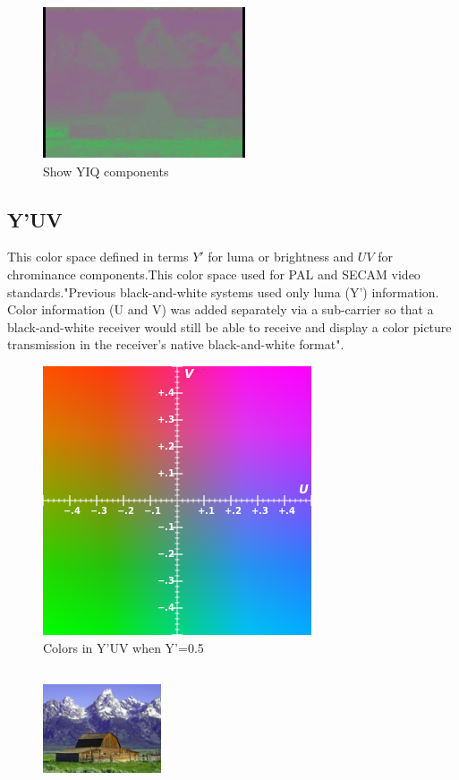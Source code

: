 \documentclass{article}
\begin{document}
\begin{multicols*}{2}
\begin{figure}[H]
\includegraphics[scale=0.5]{Q.png}
\caption{Show YIQ components}
\end{figure}
\subsection*{Y'UV}
This color space defined in terms \(Y'\) for luma or brightness and \(UV\) for chrominance components.This color space used for PAL and SECAM video standards."Previous black-and-white systems used only luma (Y') information. Color information (U and V) was added separately via a sub-carrier so that a black-and-white receiver would still be able to receive and display a color picture transmission in the receiver's native black-and-white format".\cite{12}
\begin{figure}[H]
\includegraphics[scale=0.5]{YUV.png}
\caption{Colors in Y'UV when Y'=0.5}
\end{figure}
\begin{figure}[H]
\includegraphics[height=35mm,width=35mm]{YUVall.png}

\end{figure}
\end{multicols*}
\end{document}
